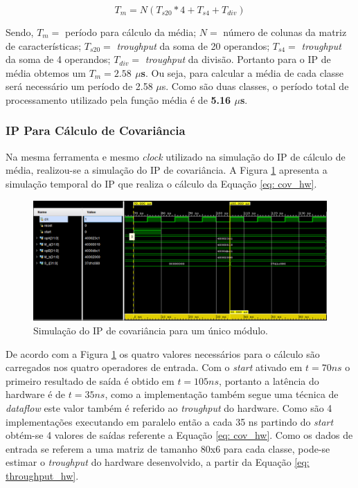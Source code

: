 \begin{equation}
\label{eq: throughput}
	T_m = N(T_{s20}*4 + T_{s4} + T_{div})  
\end{equation}

Sendo, $T_m =$ período para cálculo da média; $N =$ número de colunas da matriz de características; $T_{s20} =$ \textit{troughput} da soma de 20 operandos; $T_{s4} =$ \textit{troughput} da soma de 4 operandos; $T_{div} =$ \textit{troughput} da divisão. Portanto para o IP de média obtemos um \textbf{$T_m = 2.58$ $\mu$s}. Ou seja, para calcular a média de cada classe será necessário um período de 2.58 $\mu$s. Como são duas classes, o período total de processamento utilizado pela função média é de \textbf{5.16 $\mu$s}.

\subsubsection{IP Para Cálculo de Covariância}

Na mesma ferramenta e mesmo \textit{clock} utilizado na simulação do IP de cálculo de média, realizou-se a simulação do IP de covariância. A Figura \ref{simulacao_cov} apresenta a simulação temporal do IP que realiza o cálculo da Equação \ref{eq: cov_hw}.


\begin{figure}[!h]
	\centering
	\includegraphics[keepaspectratio=true,scale=0.5]{figuras/Simulacao_cov.PNG}
	\caption{Simulação do IP de covariância para um único módulo.}
	\label{simulacao_cov}
\end{figure}

De acordo com a Figura \ref{simulacao_cov} os quatro valores necessários para o cálculo são carregados nos quatro operadores de entrada. Com o \textit{start} ativado em $t = 70 ns$ o primeiro resultado de saída é obtido em $t = 105 ns$, portanto a latência do hardware é de $t = 35 ns$, como a implementação também segue uma técnica de \textit{dataflow} este valor também é referido ao \textit{troughput} do hardware. Como são 4 implementações executando em paralelo então a cada 35 ns partindo do \textit{start} obtém-se 4 valores de saídas referente a Equação \ref{eq: cov_hw}. Como os dados de entrada se referem a uma matriz de tamanho 80x6 para cada classe, pode-se estimar o \textit{troughput} do hardware desenvolvido, a partir da Equação \ref{eq: throughput_hw}.


